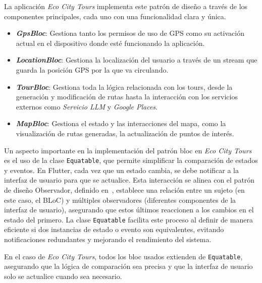 La aplicación \textit{Eco City Tours} implementa este patrón de diseño a través de los componentes principales, cada uno con una funcionalidad clara y única.
\begin{itemize}
	\item \textbf{\textit{GpsBloc}}: Gestiona tanto los permisos de uso de GPS como su activación actual en el dispositivo donde esté funcionando la aplicación.
	\item \textbf{\textit{LocationBloc}}: Gestiona la localización del usuario a través de un stream que guarda la posición GPS por la que va circulando.
	\item \textbf{\textit{TourBloc}}: Gestiona toda la lógica relacionada con los tours, desde la generación y modificación de rutas hasta la interacción con los servicios externos como \textit{Servicio LLM} y \textit{Google Places}.
	\item \textbf{\textit{MapBloc}}: Gestiona el estado y las interacciones del mapa, como la visualización de rutas generadas, la actualización de puntos de interés.
\end{itemize}

Un aspecto importante en la implementación del patrón \acrshort{bloc} en \textit{Eco City Tours} es el uso de la clase \texttt{Equatable}, que permite simplificar la comparación de estados y eventos. En Flutter, cada vez que un estado cambia, se debe notificar a la interfaz de usuario para que se actualice. Esta interacción se alinea con el patrón de diseño Observador, definido en~\cite{gamma2002patrones}, establece una relación entre un sujeto (en este caso, el BLoC) y múltiples observadores (diferentes componentes de la interfaz de usuario), asegurando que estos últimos reaccionen a los cambios en el estado del primero. La clase \texttt{Equatable} facilita este proceso al definir de manera eficiente si dos instancias de estado o evento son equivalentes, evitando notificaciones redundantes y mejorando el rendimiento del sistema.

En el caso de \textit{Eco City Tours}, todos los \acrshort{bloc} usados extienden de \texttt{Equatable}, asegurando que la lógica de comparación sea precisa y que la interfaz de usuario solo se actualice cuando sea necesario. 

